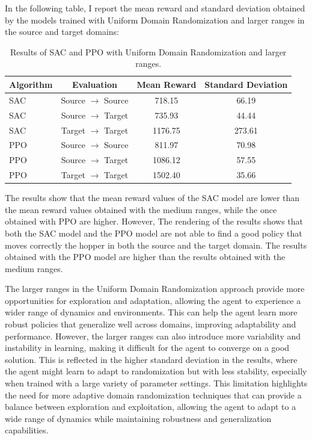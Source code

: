 \documentclass[12pt]{article}
\begin{document}
In the following table, I report the mean reward and standard deviation obtained by the models trained with Uniform Domain Randomization and larger ranges in the source and target domains:

\begin{table}[H]
    \centering
    \begin{tabular}{|l|c|c|c|}
        \hline
        \textbf{Algorithm} & \textbf{Evaluation} & \textbf{Mean Reward} & \textbf{Standard Deviation} \\ \hline
        SAC & Source $\rightarrow$ Source & 718.15 & 66.19 \\ 
        SAC & Source $\rightarrow$ Target & 735.93 & 44.44 \\ 
        SAC & Target $\rightarrow$ Target & 1176.75 & 273.61 \\ \hline
        PPO & Source $\rightarrow$ Source & 811.97 & 70.98 \\ 
        PPO & Source $\rightarrow$ Target & 1086.12 & 57.55 \\ 
        PPO & Target $\rightarrow$ Target & 1502.40 & 35.66 \\ \hline
    \end{tabular}
    \caption{Results of SAC and PPO with Uniform Domain Randomization and larger ranges.}
    \label{tab:results_udr_larger}
\end{table}

The results show that the mean reward values of the SAC model are lower than the mean reward values obtained with the medium ranges, while the once obtained with PPO are higher. However, The rendering of the results shows that both the SAC model and the PPO model are not able to find a good policy that moves correctly the hopper in both the source and the target domain. The results obtained with the PPO model are higher than the results obtained with the medium ranges. 

The larger ranges in the Uniform Domain Randomization approach provide more opportunities for exploration and adaptation, allowing the agent to experience a wider range of dynamics and environments. This can help the agent learn more robust policies that generalize well across domains, improving adaptability and performance. However, the larger ranges can also introduce more variability and instability in learning, making it difficult for the agent to converge on a good solution. This is reflected in the higher standard deviation in the results, where the agent might learn to adapt to randomization but with less stability, especially when trained with a large variety of parameter settings. This limitation highlights the need for more adaptive domain randomization techniques that can provide a balance between exploration and exploitation, allowing the agent to adapt to a wide range of dynamics while maintaining robustness and generalization capabilities.
\end{document}
